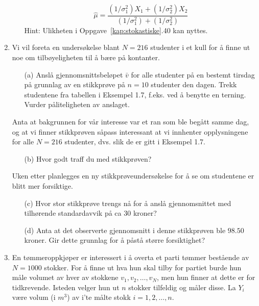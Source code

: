 \begin{enumerate}
\begin{itemize}
\[   \hat\mu = \frac{(1/{\sigma}_1^2)X_1 +(1/{\sigma}_2^2)X_2}
              {(1/{\sigma}_1^2) +(1/{\sigma}_2^2)} \]
	 Hint: Ulikheten i Oppgave~\ref*{kap:stokastiske}.40 kan nyttes.
 \end{itemize}
\item     Vi vil foreta en undersøkelse blant $N=216$
          studenter i et kull for å finne ut noe om
          tilbøyeligheten til å bære på kontanter.
 \begin{itemize}
  \item[(a)]  Anslå gjennomsnittsbeløpet $\bar v$ for
               alle studenter på en bestemt tirsdag på
               grunnlag av en stikkprøve på $n=10$
               studenter den dagen. Trekk studentene fra tabellen
               i Eksempel 1.7, f.eks. ved å benytte en
               terning. Vurder påliteligheten av anslaget.
 \end{itemize}
          Anta at bakgrunnen for vår interesse var et ran som
          ble begått samme dag, og at vi finner
          stikkprøven såpass interessant at vi innhenter
          opplysningene for alle $N=216$ studenter, dvs. slik de
          er gitt i Eksempel 1.7.
 \begin{itemize}     
 \item[(b)]  Hvor godt traff du med stikkprøven?
 \end{itemize}     
          Uken etter planlegges en ny
          stikkprøveundersøkelse for å se om studentene
          er blitt mer forsiktige.
 \begin{itemize}
  \item[(c)]  Hvor stor stikkprøve trengs nå for å
               anslå gjennomsnittet med til\-hørende
               standardavvik på ca $30$ kroner?
  \item[(d)]  Anta at det observerte gjennomsnitt i denne
               stikkprøven ble $98.50$ kroner. Gir dette
               grunnlag for å påstå større
               forsiktighet?
 \end{itemize}
\item     En tømmeroppkjøper er interessert i å overta
          et parti tømmer bestående av $N=1000$ stokker.
          For å finne ut hva hun skal tilby for partiet burde
          hun måle volumet av hver av stokkene
          $v_1,v_2,\ldots ,v_N$, men hun finner at dette er for
          tidkrevende. Isteden velger hun ut $n$ stokker
          tilfeldig og måler disse. La $Y_i$ være volum
          (i $m^3$) av i'te målte stokk $i=1,2,\ldots ,n$.
 \begin{itemize}

\end{itemize}
\end{enumerate}
